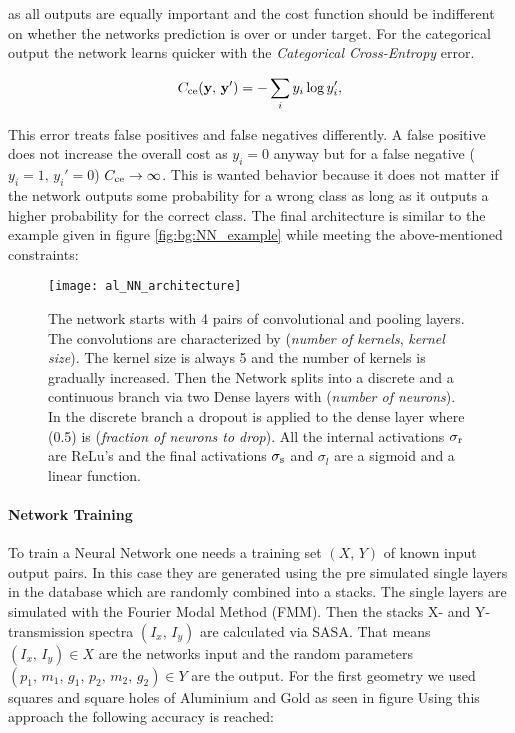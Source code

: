 \noindent
as all outputs are equally important and the cost function should be indifferent on whether the networks prediction is over or under target. For the categorical output the network learns quicker with the \textit{Categorical Cross-Entropy} error.

\begin{equation}
    C_{\mathrm{ce}}(\vb y, \, \vb y') = - \sum_i y_i \log y'_i,
\end{equation}

\noindent
This error treats false positives and false negatives differently. A false positive does not increase the overall cost as $y_i = 0$ anyway but for a false negative ($y_i = 1, \, y_i' = 0$) $C_{\mathrm{ce}} \rightarrow \infty$. This is wanted behavior because it does not matter if the network outputs some probability for a wrong class as long as it outputs a higher probability for the correct class. The final architecture is similar to the example given in figure \ref{fig:bg:NN_example} while meeting the above-mentioned constraints:

\begin{figure}[H]
    \centering
    \texttt{[image: al\_NN\_architecture]}
    \caption{The network starts with 4 pairs of convolutional and pooling layers. The convolutions are characterized by (\textit{number of kernels}, \textit{kernel size}). The kernel size is always 5 and the number of kernels is gradually increased. Then the Network splits into a discrete and a continuous branch via two Dense layers with (\textit{number of neurons}). In the discrete branch a dropout is applied to the dense layer where (0.5) is (\textit{fraction of neurons to drop}).
    All the internal activations $\sigma_{\mathrm{r}}$ are ReLu's and the final activations $\sigma_{\mathrm{s}}$ and $\sigma_{l}$ are a sigmoid and a linear function.}
    \label{fig:al:NN_architecture}
\end{figure}

\newpage
\paragraph{Network Training}
To train a Neural Network one needs a training set $(X, \, Y)$ of known input output pairs. In this case they are generated using the pre simulated single layers in the database which are randomly combined into a stacks. The single layers are simulated with the Fourier Modal Method (FMM). Then the stacks X- and Y-transmission spectra $(I_x, \, I_y)$ are calculated via SASA.
That means $(I_x, \, I_y) \in X$ are the networks input and the random parameters $(p_1, \, m_1, \, g_1, \, p_2, \, m_2, \, g_2) \in Y$ are the output. For the first geometry we used squares and square holes of Aluminium and Gold as seen in figure
Using this approach the following accuracy is reached:

